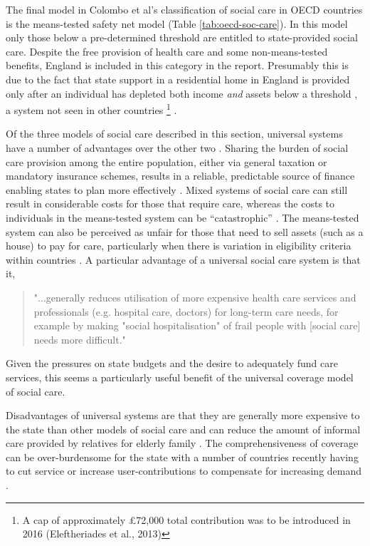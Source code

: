 \documentclass[12pt,]{report}
\let\rmarkdownfootnote\footnote%
\def\footnote{\protect\rmarkdownfootnote}
\begin{document}
The final model in Colombo et al's \citeyearpar{RN414} classification of
social care in OECD countries is the means-tested safety net model
(Table \ref{tab:oecd-soc-care}). In this model only those below a
pre-determined threshold are entitled to state-provided social care.
Despite the free provision of health care and some non-means-tested
benefits, England is included in this category in the report. Presumably
this is due to the fact that state support in a residential home in
England is provided only after an individual has depleted both income
\textit{and} assets below a threshold \citep{RN414}, a system not seen
in other countries
\footnote{A cap of approximately £72,000 total contribution was to be introduced in 2016 (Eleftheriades et al., 2013)}
\citep{RN420}.

Of the three models of social care described in this section, universal
systems have a number of advantages over the other two
\citep{RN414, RN420}. Sharing the burden of social care provision among
the entire population, either via general taxation or mandatory
insurance schemes, results in a reliable, predictable source of finance
enabling states to plan more effectively \citep{RN414, RN420, RN413}.
Mixed systems of social care can still result in considerable costs for
those that require care, whereas the costs to individuals in the
means-tested system can be ``catastrophic'' \citep[pp240]{RN414}. The
means-tested system can also be perceived as unfair for those that need
to sell assets (such as a house) to pay for care, particularly when
there is variation in eligibility criteria within countries
\citep{RN414, RN420, RN421, RN407, RN413}. A particular advantage of a
universal social care system is that it,

\begin{quotation} 
"...generally reduces utilisation of more expensive health care services and professionals (e.g. hospital care, doctors) for long-term care needs, for example by making "social hospitalisation" of frail people with [social care] needs more difficult." 
\end{quotation}

\citep[pp.222]{RN414}

Given the pressures on state budgets and the desire to adequately fund
care services, this seems a particularly useful benefit of the universal
coverage model of social care.

Disadvantages of universal systems are that they are generally more
expensive to the state than other models of social care and can reduce
the amount of informal care provided by relatives for elderly family
\citep{RN414, RN407}. The comprehensiveness of coverage can be
over-burdensome for the state with a number of countries recently having
to cut service or increase user-contributions to compensate for
increasing demand \citep{RN345, RN421, RN407, RN413}.
\end{document}
